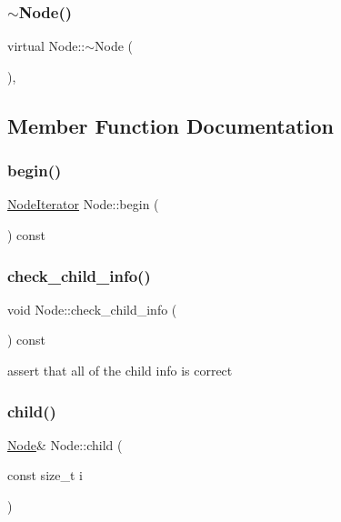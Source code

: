 \subsubsection{\texorpdfstring{$\sim$\+Node()}{~Node()}}
{\footnotesize\ttfamily virtual Node\+::$\sim$\+Node (\begin{DoxyParamCaption}{ }\end{DoxyParamCaption})\hspace{0.3cm}{\ttfamily [inline]}, {\ttfamily [virtual]}}



\subsection{Member Function Documentation}
\mbox{\label{class_node_a319b65eca94c9438201ebda99ab90a65}} 
\subsubsection{\texorpdfstring{begin()}{begin()}}
{\footnotesize\ttfamily \hyperlink{class_node_1_1_node_iterator}{Node\+Iterator} Node\+::begin (\begin{DoxyParamCaption}{ }\end{DoxyParamCaption}) const\hspace{0.3cm}{\ttfamily [inline]}}

\mbox{\label{class_node_ab8f9492893b0e2b2d7b3d1819dacc92b}} 
\subsubsection{\texorpdfstring{check\+\_\+child\+\_\+info()}{check\_child\_info()}}
{\footnotesize\ttfamily void Node\+::check\+\_\+child\+\_\+info (\begin{DoxyParamCaption}{ }\end{DoxyParamCaption}) const\hspace{0.3cm}{\ttfamily [inline]}}

assert that all of the child info is correct\mbox{\label{class_node_a23adfa03c20f4141b1105c5b4b1bca3f}} 
\subsubsection{\texorpdfstring{child()}{child()}\hspace{0.1cm}{\footnotesize\ttfamily [1/2]}}
{\footnotesize\ttfamily \hyperlink{class_node}{Node}\& Node\+::child (\begin{DoxyParamCaption}\item[{const size\+\_\+t}]{i }\end{DoxyParamCaption})\hspace{0.3cm}{\ttfamily [inline]}}

